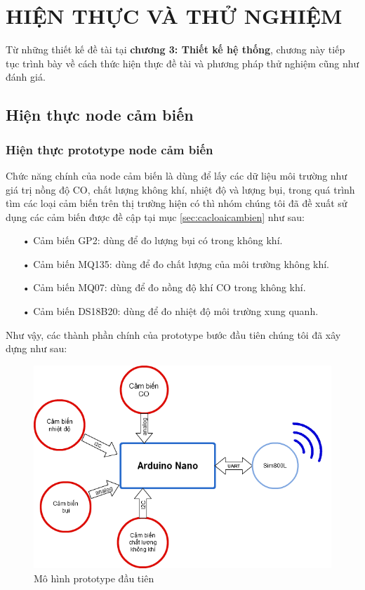 \chapter{HIỆN THỰC VÀ THỬ NGHIỆM}

\ifpdf
    \graphicspath{{Chapter3/Figs/Raster/}{Chapter3/Figs/server/}{Chapter3/Figs/}}
\else
    \graphicspath{{Chapter3/Figs/Vector/}{Chapter3/Figs/}}
\fi
Từ những thiết kế đề tài tại \textbf{chương 3: Thiết kế hệ thống}, chương này tiếp tục trình bày về cách thức hiện thực đề tài và phương pháp thử nghiệm cũng như đánh giá.
\section{Hiện thực node cảm biến}
\subsection{Hiện thực prototype node cảm biến}\label{sc:prototype_dautien}
Chức năng chính của node cảm biến là dùng để lấy các dữ liệu môi trường như giá trị nồng độ CO, chất lượng không khí, nhiệt độ và lượng bụi, trong quá trình tìm các loại cảm biến trên thị trường hiện có thì nhóm chúng tôi đã đề xuất sử dụng các cảm biến được đề cập tại mục \ref{sec:cacloaicambien} như sau:
\begin{itemize}
	\item[•]Cảm biến GP2: dùng để đo lượng bụi có trong không khí.
	\item[•]Cảm  biến MQ135: dùng để đo chất lượng của môi trường không khí.
	\item[•]Cảm biến MQ07: dùng để đo nồng độ khí CO trong không khí.
	\item[•]Cảm biến DS18B20: dùng để đo nhiệt độ môi trường xung quanh. 
\end{itemize}
Như vậy, các thành phần chính của prototype bước đầu tiên chúng tôi đã xây dựng như sau:
\begin{figure}[H]
	\centering    
	\includegraphics[width=5in]{prototype_1}
	\caption[Mô hình prototype đầu tiên]{Mô hình prototype đầu tiên}
	\label{fig:prototype_1}
\end{figure}
